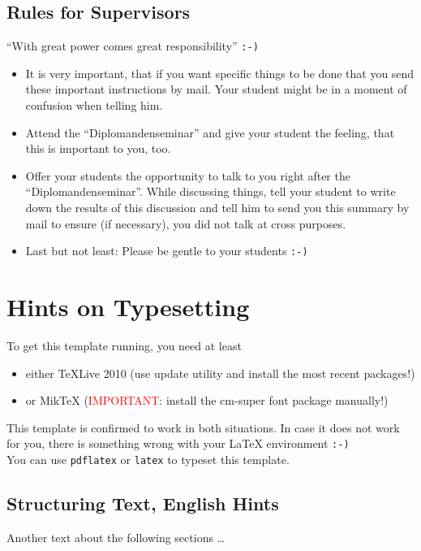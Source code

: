 \subsection{Rules for Supervisors}
\enquote{With great power comes great responsibility} \texttt{:-)}

\begin{itemize}
\item It is very important, that if you want specific things to be done that you send these important instructions by mail. Your student might be in a moment of confusion when telling him.
\item Attend the \enquote{Diplomandenseminar} and give your student the feeling, that this is important to you, too.
\item Offer your students the opportunity to talk to you right after the \enquote{Diplomandenseminar}. While discussing things, tell your student to write down the results of this discussion and tell him to send you this summary by mail to ensure (if necessary), you did not talk at cross purposes.
\item Last but not least: Please be gentle to your students \texttt{:-)}
\end{itemize}

\section{Hints on Typesetting}
To get this template running, you need at least

\begin{itemize}
\item either TeXLive 2010 (use update utility and install the most recent packages!)
\item or MikTeX (\textcolor{red}{IMPORTANT}: install the cm-super font package manually!)
\end{itemize}

This template is confirmed to work in both situations. In case it does not work for you, there is something wrong with your \LaTeX\/ environment \texttt{:-)}\\

You can use \texttt{pdflatex} or \texttt{latex} to typeset this template.

\subsection{Structuring Text, English Hints}
Another text about the following sections \dots

